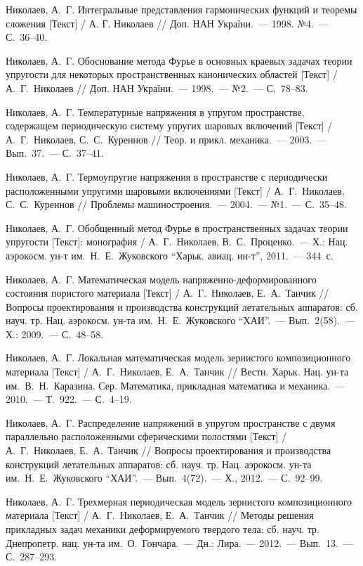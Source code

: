 \begin{biblist}{99}
Николаев, А.~Г. 
Интегральные представления гармонических функций и теоремы сложения [Текст] 
/ А. Г. Николаев // Доп. НАН України.~--- 1998. №4.~--- С.~36--40.

Николаев, А.~Г. 
Обоснование метода Фурье в основных краевых задачах теории упругости для некоторых пространственных канонических областей [Текст] 
/ А.~Г.~Николаев 
// Доп. НАН України.~--- 1998.~--- №2.~--- С.~78--83.

Николаев, А.~Г. 
Температурные напряжения в упругом пространстве, содержащем периодическую систему упругих шаровых включений [Текст] 
/ А.~Г.~Николаев, С.~С.~Куреннов 
// Теор. и прикл. механика.~--- 2003.~--- Вып.~37.~--- С.~37--41.

Николаев, А.~Г. 
Термоупругие напряжения в пространстве с периодически расположенными упругими шаровыми включениями [Текст] 
/ А.~Г.~Николаев, С.~С.~Куреннов 
// Проблемы машиностроения.~--- 2004.~--- №1.~--- С.~35--48.

Николаев, А.~Г. 
Обобщенный метод Фурье в пространственных задачах теории упругости [Текст]: монография 
/ А.~Г.~Николаев, В.~С.~Проценко.~--- Х.: Нац. аэрокосм. ун-т им.~Н.~Е.~Жуковского ``Харьк. авиац. ин-т'', 2011.~--- 344~с. 

Николаев, А.~Г. 
Математическая модель напряженно-деформированного состояния пористого материала [Текст] 
/ А.~Г.~Николаев, Е.~А.~Танчик 
// Вопросы проектирования и производства конструкций летательных аппаратов: сб. науч. тр. Нац. аэрокосм. ун-та им.~Н.~Е.~Жуковского ``ХАИ''.~--- Вып.~2(58).~--- Х.: 2009.~--- С.~48--58.

Николаев, А.~Г. 
Локальная математическая модель зернистого композиционного материала [Текст] 
/ А.~Г.~Николаев, Е.~А.~Танчик 
// Вестн. Харьк. Нац. ун-та им.~В.~Н.~Каразина. Сер. Математика, прикладная математика и механика.~--- 2010.~--- Т.~922.~--- С.~4--19.

Николаев, А.~Г. 
Распределение напряжений в упругом пространстве с двумя параллельно расположенными сферическими полостями [Текст] 
/ А.~Г.~Николаев, Е.~А.~Танчик 
// Вопросы проектирования и производства конструкций летательных аппаратов: сб. науч. тр. Нац. аэрокосм. ун-та им.~Н.~Е.~Жуковского ``ХАИ''.~--- Вып.~4(72).~--- Х., 2012.~--- С.~92--99.

Николаев, А.~Г. 
Трехмерная периодическая модель зернистого композиционного материала [Текст] 
/ А.~Г.~Николаев, Е.~А.~Танчик 
// Методы решения прикладных задач механики деформируемого твердого тела: сб. науч. тр. Днепропетр. нац. ун-та им.~О.~Гончара.~--- Дн.: Лира.~--- 2012.~--- Вып.~13.~--- С.~287--293.


\end{biblist}
